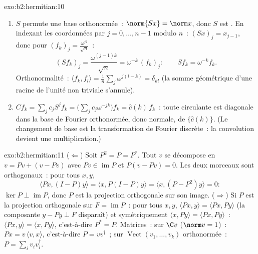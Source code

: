 \begin{solution}{exo:b2:hermitian:10}
\begin{enumerate}
  \item $S$ permute une base orthonormée~: $\norm{Sx} = \norm
        x$, donc $S$ est . En indexant les coordonnées par $j = 0,
        \dots, n-1$ modulo $n$~: $(Sx)_j = x_{j-1}$, donc pour
        $(f_k)_j = \frac{\omega^{jk}}{\sqrt n}$~:
        \[
        (Sf_k)_j = \frac{\omega^{(j-1)k}}{\sqrt n}
        = \omega^{-k}\,(f_k)_j :
        \qquad Sf_k = \omega^{-k}f_k .
        \]
        Orthonormalité~: $\langle f_k, f_l\rangle = \frac1n
        \sum_j \omega^{j(l-k)} = \delta_{kl}$ (la somme géométrique
        d'une racine de l'unité non triviale s'annule).
  \item $Cf_k = \sum_j c_j S^jf_k = \bigl(\sum_j
        c_j\omega^{-jk}\bigr)f_k = \widehat c(k)\,f_k$~: toute
        circulante est diagonale dans la base de Fourier orthonormée,
        donc normale, de  $\{\widehat c(k)\}$. (Le
        changement de base est la transformation de Fourier discrète~:
        la convolution devient une multiplication.)
\end{enumerate}
\end{solution}

\begin{solution}{exo:b2:hermitian:11}
($\Leftarrow$) Soit $P^2 = P = P^*$. Tout $v$ se décompose en $v = Pv
+ (v - Pv)$ avec $Pv \in \operatorname{im} P$ et $P(v - Pv) =
0$. Les deux morceaux sont orthogonaux~: pour tous $x, y$,
\[
\langle Px, (I - P)y\rangle = \langle x, P(I-P)y\rangle
= \langle x, (P - P^2)y\rangle = 0 :
\]
$\ker P \perp \operatorname{im} P$, donc $P$ est la projection
orthogonale sur son image. ($\Rightarrow$) Si $P$ est la
projection orthogonale sur $F = \operatorname{im}P$~: pour tous
$x, y$, $\langle Px, y\rangle = \langle Px, Py\rangle$ (la
composante $y - Py \perp F$ disparaît) et symétriquement $\langle
x, Py\rangle = \langle Px, Py\rangle$~: $\langle Px, y\rangle =
\langle x, Py\rangle$, c'est-à-dire $P^* = P$. Matrices~: sur $\C v$
($\norm v = 1$)~: $Px = v\,\langle v, x\rangle$, c'est-à-dire $P =
vv^\dagger$~; sur $\operatorname{Vect}(v_1, \dots, v_k)$
orthonormée~: $P = \sum_i v_iv_i^\dagger$.
\end{solution}

